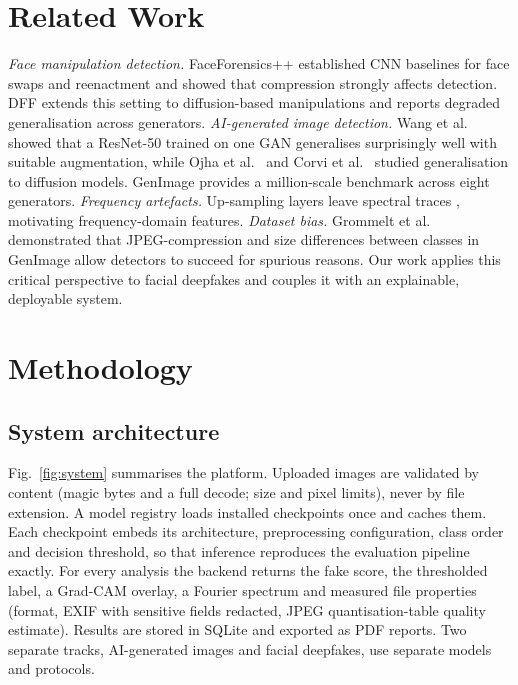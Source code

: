 \documentclass[conference]{IEEEtran}
\begin{document}
\section{Related Work}
\textit{Face manipulation detection.} FaceForensics++ \cite{rossler2019ff} established CNN baselines for face swaps and reenactment and showed that compression strongly affects detection. DFF \cite{song2023dff} extends this setting to diffusion-based manipulations and reports degraded generalisation across generators. \textit{AI-generated image detection.} Wang et al.\ \cite{wang2020cnn} showed that a ResNet-50 trained on one GAN generalises surprisingly well with suitable augmentation, while Ojha et al.\ \cite{ojha2023universal} and Corvi et al.\ \cite{corvi2023diffusion} studied generalisation to diffusion models. GenImage \cite{zhu2023genimage} provides a million-scale benchmark across eight generators. \textit{Frequency artefacts.} Up-sampling layers leave spectral traces \cite{durall2020upconv,frank2020frequency}, motivating frequency-domain features. \textit{Dataset bias.} Grommelt et al.\ \cite{grommelt2024fake} demonstrated that JPEG-compression and size differences between classes in GenImage allow detectors to succeed for spurious reasons. Our work applies this critical perspective to facial deepfakes and couples it with an explainable, deployable system.

\section{Methodology}

\subsection{System architecture}
Fig.~\ref{fig:system} summarises the platform. Uploaded images are validated by content (magic bytes and a full decode; size and pixel limits), never by file extension. A model registry loads installed checkpoints once and caches them. Each checkpoint embeds its architecture, preprocessing configuration, class order and decision threshold, so that inference reproduces the evaluation pipeline exactly. For every analysis the backend returns the fake score, the thresholded label, a Grad-CAM overlay, a Fourier spectrum and measured file properties (format, EXIF with sensitive fields redacted, JPEG quantisation-table quality estimate). Results are stored in SQLite and exported as PDF reports. Two separate tracks, AI-generated images and facial deepfakes, use separate models and protocols.
\end{document}
